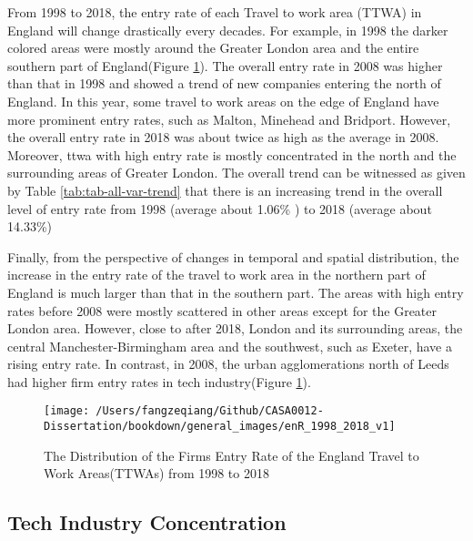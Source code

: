 \documentclass[
  12pt,
  oneside]{book}
\begin{document}
From 1998 to 2018, the entry rate of each Travel to work area (TTWA) in England will change drastically every decades. For example, in 1998 the darker colored areas were mostly around the Greater London area and the entire southern part of England(Figure \ref{fig:fig-enR-1998-2018-v1}). The overall entry rate in 2008 was higher than that in 1998 and showed a trend of new companies entering the north of England. In this year, some travel to work areas on the edge of England have more prominent entry rates, such as Malton, Minehead and Bridport. However, the overall entry rate in 2018 was about twice as high as the average in 2008. Moreover, ttwa with high entry rate is mostly concentrated in the north and the surrounding areas of Greater London. The overall trend can be witnessed as given by Table \ref{tab:tab-all-var-trend} that there is an increasing trend in the overall level of entry rate from 1998 (average about 1.06\% ) to 2018
(average about 14.33\%)

Finally, from the perspective of changes in temporal and spatial distribution, the increase in the entry rate of the travel to work area in the northern part of England is much larger than that in the southern part. The areas with high entry rates before 2008 were mostly scattered in other areas except for the Greater London area. However, close to after 2018, London and its surrounding areas, the central Manchester-Birmingham area and the southwest, such as Exeter, have a rising entry rate. In contrast, in 2008, the urban agglomerations north of Leeds had higher firm entry rates in tech industry(Figure \ref{fig:fig-enR-1998-2018-v1}).

\begin{figure}
\texttt{[image: /Users/fangzeqiang/Github/CASA0012-Dissertation/bookdown/general\_images/enR\_1998\_2018\_v1]} \caption{The Distribution of the Firms Entry Rate of the England Travel to Work Areas(TTWAs) from 1998 to 2018}\label{fig:fig-enR-1998-2018-v1}
\end{figure}

\hypertarget{tech-industry-concentration}{%
\subsection{Tech Industry Concentration}\label{tech-industry-concentration}}
\end{document}
